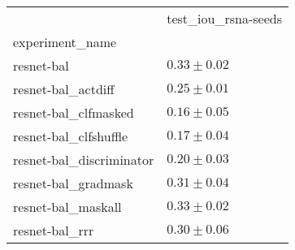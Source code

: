 \begin{tabular}{ll}
\toprule
{} & test_iou_rsna-seeds \\
experiment_name          &                     \\
\midrule
resnet-bal               &       $0.33\pm0.02$ \\
resnet-bal_actdiff       &       $0.25\pm0.01$ \\
resnet-bal_clfmasked     &       $0.16\pm0.05$ \\
resnet-bal_clfshuffle    &       $0.17\pm0.04$ \\
resnet-bal_discriminator &       $0.20\pm0.03$ \\
resnet-bal_gradmask      &       $0.31\pm0.04$ \\
resnet-bal_maskall       &       $0.33\pm0.02$ \\
resnet-bal_rrr           &       $0.30\pm0.06$ \\
\bottomrule
\end{tabular}
